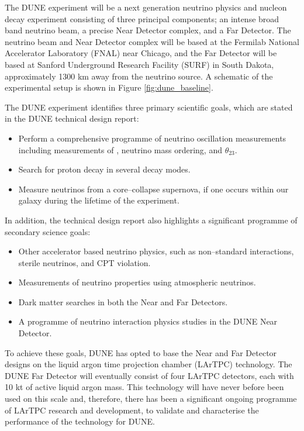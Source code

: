 The DUNE experiment will be a next generation neutrino physics and nucleon decay
experiment consisting of three principal components; an intense broad band 
neutrino beam, a precise Near Detector complex, and a Far Detector. The neutrino
beam and Near Detector complex will be based at the Fermilab National 
Accelerator Laboratory (FNAL) near Chicago, and the Far Detector will be based 
at Sanford Underground Research Facility (SURF) in South Dakota, approximately 
1300 km away from the neutrino source. A schematic of the experimental setup 
is shown in Figure \ref{fig:dune_baseline}. 

The DUNE experiment identifies three primary scientific goals, which are stated
in the DUNE technical design report\cite{Abi:2020evt}:
\begin{itemize}
	\item Perform a comprehensive programme of neutrino oscillation measurements
		including measurements of \dcp{}, neutrino mass ordering, and $\theta_{23}$.
	\item Search for proton decay in several decay modes.
	\item Measure neutrinos from a core--collapse supernova, if one occurs within 
		our galaxy during the lifetime of the experiment.
\end{itemize}
In addition, the technical design report also highlights a significant programme
of secondary science goals:
\begin{itemize}
	\item Other accelerator based neutrino physics, such as non--standard
		interactions, sterile neutrinos, and CPT violation.
	\item Measurements of neutrino properties using atmospheric neutrinos.
	\item Dark matter searches in both the Near and Far Detectors.
	\item A programme of neutrino interaction physics studies in the DUNE Near
		Detector.
\end{itemize}

\noindent
To achieve these goals, DUNE has opted to base the Near and Far Detector designs
on the liquid argon time projection chamber (LArTPC) technology. The DUNE
Far Detector will eventually consist of four LArTPC detectors, each with 10 kt 
of active liquid argon mass. This technology will have never before been used 
on this scale and, therefore, there has been a significant ongoing programme 
of LArTPC research and development, to validate and characterise the performance
of the technology for DUNE. 

